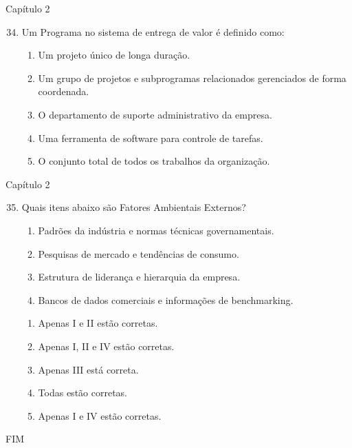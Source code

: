 \documentclass{beamer}
\begin{document}
\begin{frame}{Capítulo 2}
	\begin{enumerate}
		\setcounter{enumi}{33}
		\justifying
		\item Um Programa no sistema de entrega de valor é definido como:
		\begin{enumerate}[a]
			\justifying
			\item Um projeto único de longa duração.
			\item \alert<2>{Um grupo de projetos e subprogramas relacionados gerenciados de forma coordenada}.
			\item O departamento de suporte administrativo da empresa.
			\item Uma ferramenta de software para controle de tarefas.
			\item O conjunto total de todos os trabalhos da organização.
		\end{enumerate}
	\end{enumerate}
\end{frame}

\begin{frame}{Capítulo 2}
	\begin{enumerate}
		\setcounter{enumi}{34}
		\justifying
		\item Quais itens abaixo são Fatores Ambientais Externos?
		
		\begin{enumerate}[I]
			\item Padrões da indústria e normas técnicas governamentais.
			\item Pesquisas de mercado e tendências de consumo.
			\item Estrutura de liderança e hierarquia da empresa.
			\item Bancos de dados comerciais e informações de benchmarking.
		\end{enumerate}
		
		\vspace{10pt}
		\begin{enumerate}[a]
			\item Apenas I e II estão corretas.
			\item \alert<2>{Apenas I, II e IV estão corretas}.
			\item Apenas III está correta.
			\item Todas estão corretas.
			\item Apenas I e IV estão corretas.
		\end{enumerate}
	\end{enumerate}
\end{frame}


\begin{frame}
    \centering
    \Large
    FIM
\end{frame}
    
\end{document}

